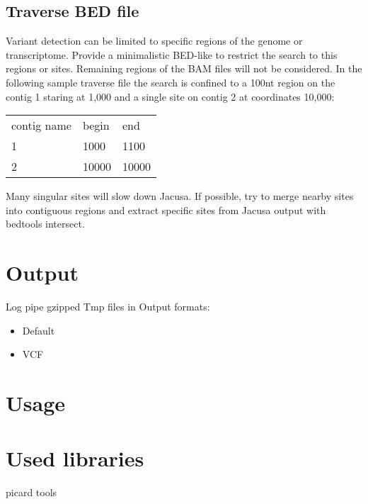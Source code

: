 \documentclass[10pt, a4paper]{article}
\begin{document}
\subsection{Traverse BED file}
Variant detection can be limited to specific regions of the genome or transcriptome. 
Provide a minimalistic BED-like to restrict the search to this regions or sites. Remaining regions of the BAM files will not be considered.  
In the following sample traverse file the search is confined to a 100nt region on the contig 1 staring at 1,000 and a single site on contig 2 at coordinates 10,000:  
\begin{table}
  \begin{tabular}{lll}
    contig name & begin & end \\
    1 & 1000 & 1100 \\
    2 & 10000 & 10000
  \end{tabular}
\end{table}
Many singular sites will slow down Jacusa. 
If possible, try to merge nearby sites into contiguous regions and extract specific sites from Jacusa output with bedtools intersect.

\section{Output}
Log
pipe
gzipped Tmp files in
Output formats:
\begin{itemize}
  \item Default
  \item VCF
\end{itemize}

\section{Usage}

\section{Used libraries}
picard tools
\end{document}
